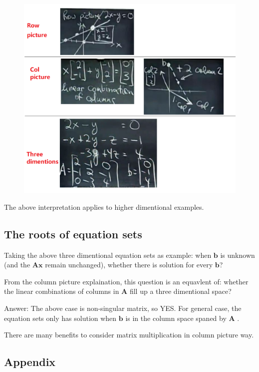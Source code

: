 \documentclass{article}
\begin{document}
\begin{figure}[h]
  \centering\includegraphics[scale=0.45]{figures/1.png}
\end{figure}

The above interpretation applies to higher dimentional examples.

\subsection{The roots of equation sets}
Taking the above three dimentional equation sets as example: when
$\boldsymbol{b}$ is unknown (and the $\boldsymbol{Ax}$ remain unchanged),
whether there is solution for every $\boldsymbol{b}$?

From the column picture explaination, this question is an equavlent of: whether
the linear combinations of columns in $\boldsymbol{A}$ fill up a three
dimentional space?

Answer:
The above case is non-singular matrix, so YES.
For general case, the equation sets {\color{red} only has solution when $\boldsymbol{b}$ is
in the column space spaned by $\boldsymbol{A}$ }.

There are many benefits to consider matrix multiplication in {\color{red} column
  picture} way.

\subsection{Appendix}
\end{document}
